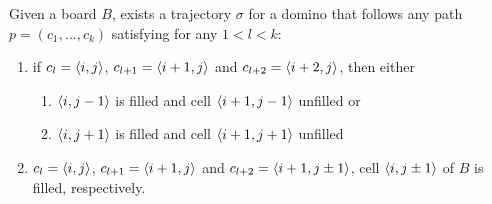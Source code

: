 \begin{lemma} 
  Given a board $B$, exists a trajectory $\sigma$ for a domino that follows any path $p = (c_1,\dots , c_k) $ satisfying for any $ 1 < l < k $:  \label{lemma:paths}
\begin{enumerate}
  \item if \(c_l = \cell\), \( c_{l+1} = \cell[i+1][j] \) and \( c_{l+2} = \cell[i+2][j] \), then either 
    \begin{enumerate}
      \item $\cell[i][j-1]$ is filled and cell $\cell[i+1][j-1]$ unfilled or \label{dom:path:up-left}
      \item $\cell[i][j+1]$ is filled and cell $\cell[i+1][j+1]$ unfilled \label{dom:path:up-right}
    \end{enumerate}
  \item $  c_l = \cell$, \( c_{l+1} = \cell[i+1][j] \) and \( c_{l+2} = \cell[i+1][j \pm 1] \), cell $\cell[i][j \pm 1]$ of $B$ is filled, respectively. \label{dom:path:turn} 
\end{enumerate}
\end{lemma}
